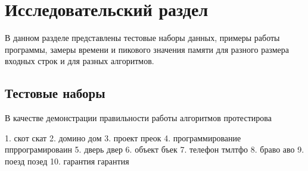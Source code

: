 \chapter{Исследовательский раздел}
В данном разделе представлены тестовые наборы данных, примеры работы программы, замеры времени и пикового значения памяти для разного размера входных строк и для разных алгоритмов.

\section{Тестовые наборы}
В качестве демонстрации правильности работы алгоритмов протестирова

1. скот скат
2. домино дом
3. проект преок
4. программирование ппррограмироваин
5. дверь двер
6. объект бъек
7. телефон тмлтфо
8. браво аво
9. поезд позед
10. гарантия гарантия
